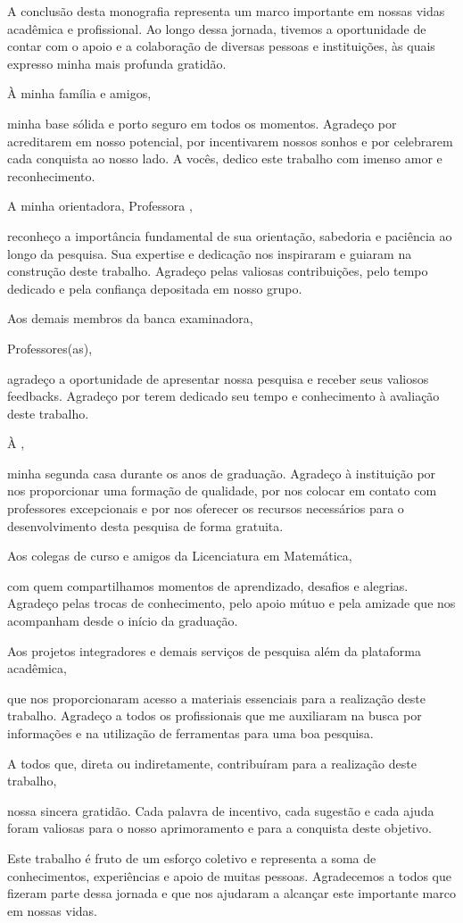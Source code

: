 \documentclass[
12pt,
 a4paper,
    english,
    brazil,
    oneside
    ]{abntex2}
\begin{document}
	\begin{agradecimentos}
		A conclusão desta monografia representa um marco importante em nossas vidas acadêmica e profissional. Ao longo dessa jornada, tivemos a oportunidade de contar com o apoio e a colaboração de diversas pessoas e instituições, às quais expresso minha mais profunda gratidão.
		
		À minha família e amigos,
		
		minha base sólida e porto seguro em todos os momentos. Agradeço por acreditarem em nosso potencial, por incentivarem nossos sonhos e por celebrarem cada conquista ao nosso lado. A vocês, dedico este trabalho com imenso amor e reconhecimento.
		
		A  minha orientadora, Professora \imprimirorientador,
		
		reconheço a importância fundamental de sua orientação, sabedoria e paciência ao longo da pesquisa. Sua expertise e dedicação nos inspiraram e guiaram na construção deste trabalho. Agradeço pelas valiosas contribuições, pelo tempo dedicado e pela confiança depositada em nosso grupo.
		
		Aos demais membros da banca examinadora,
		
		Professores(as),
		
		agradeço a oportunidade de apresentar nossa pesquisa e receber seus valiosos feedbacks. Agradeço por terem dedicado seu tempo e conhecimento à avaliação deste trabalho.
		
		À \imprimirinstituicao,
		
		minha segunda casa durante os anos de graduação. Agradeço à instituição por nos proporcionar uma formação de qualidade, por nos colocar em contato com professores excepcionais e por nos oferecer os recursos necessários para o desenvolvimento desta pesquisa de forma gratuita.
		
		Aos colegas de curso e amigos da Licenciatura em Matemática,
		
		com quem compartilhamos momentos de aprendizado, desafios e alegrias. Agradeço pelas trocas de conhecimento, pelo apoio mútuo e pela amizade que nos acompanham desde o início da graduação.
		
		Aos projetos integradores e demais serviços de pesquisa além da plataforma acadêmica,
		
		que nos proporcionaram acesso a materiais essenciais para a realização deste trabalho. Agradeço a todos os profissionais que me auxiliaram na busca por informações e na utilização de ferramentas para uma boa pesquisa.
		
		A todos que, direta ou indiretamente, contribuíram para a realização deste trabalho,
		
		nossa sincera gratidão. Cada palavra de incentivo, cada sugestão e cada ajuda foram valiosas para o nosso aprimoramento e para a conquista deste objetivo.
		
		Este trabalho é fruto de um esforço coletivo e representa a soma de conhecimentos, experiências e apoio de muitas pessoas. Agradecemos a todos que fizeram parte dessa jornada e que nos ajudaram a alcançar este importante marco em nossas vidas.
	\end{agradecimentos}
	
\end{document}
